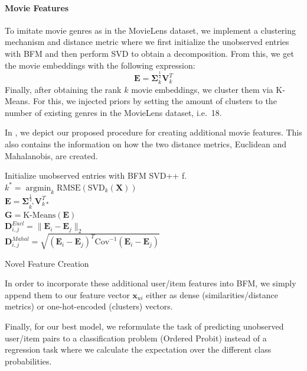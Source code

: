 \documentclass[10pt,conference,compsocconf]{IEEEtran}
\DeclareMathOperator*{\argmin}{argmin}   %
\begin{document}
    \paragraph{Movie Features}
    To imitate movie genres as in the MovieLens dataset, we implement a clustering mechanism and distance metric where we first initialize the unobserved entries with BFM and then perform SVD to obtain a decomposition.
    From this, we get the movie embeddings with the following expression:
    $$\mathbf{E}=\mathbf{\Sigma}_k ^{\frac{1}{2}} \mathbf{V}_k ^T$$
    Finally, after obtaining the rank $k$ movie embeddings, we cluster them via K-Means.
    For this, we injected priors by setting the amount of clusters to the number of existing genres in the MovieLens dataset, i.e.~18.

    In , we depict our proposed procedure for creating additional movie features.
    This also contains the information on how the two distance metrics, Euclidean and Mahalanobis, are created.

    \begin{algorithm}
        Initialize unobserved entries with BFM SVD++ f.\\
        $k^*=\argmin_{k} \text{RMSE}(\text{SVD}_{k}(\mathbf{X}))$\\
        $\mathbf{E} = \mathbf{\Sigma}^{\frac{1}{2}}_{k^*}\mathbf{V}_{k*}^T$ \\
        $\mathbf{G} = \text{K-Means}(\mathbf{E})$ \\
         {
             {
                $\mathbf{D}_{i,j} ^{Eucl} = \|\mathbf{E}_i - \mathbf{E}_j\|_2$ \\
                $\mathbf{D}_{i,j} ^{Mahal} = \sqrt{(\mathbf{E}_i-\mathbf{E}_j)^T\text{Cov}^{-1}(\mathbf{E}_i-\mathbf{E}_j)}$
            }
        }
        \caption{Novel Feature Creation}
        \label{alg:algo1}
    \end{algorithm}

    In order to incorporate these additional user/item features into BFM, we simply append them to our feature vector $\mathbf{x}_{ui}$ either as dense (similarities/distance metrics) or one-hot-encoded (clusters) vectors.

    Finally, for our best model, we reformulate the task of predicting unobserved user/item pairs to a classification problem (Ordered Probit) instead of a regression task where we calculate the expectation over the different class probabilities.
\end{document}
